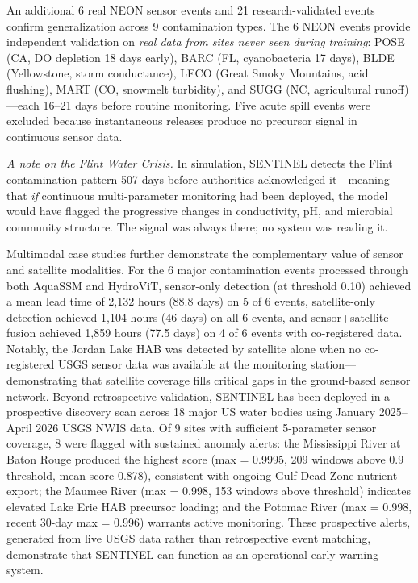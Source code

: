 \documentclass[12pt]{article}
\begin{document}
An additional 6 real NEON sensor events and 21 research-validated events confirm generalization across 9 contamination types. The 6 NEON events provide independent validation on \textit{real data from sites never seen during training}: POSE (CA, DO depletion 18 days early), BARC (FL, cyanobacteria 17 days), BLDE (Yellowstone, storm conductance), LECO (Great Smoky Mountains, acid flushing), MART (CO, snowmelt turbidity), and SUGG (NC, agricultural runoff)---each 16--21 days before routine monitoring. Five acute spill events were excluded because instantaneous releases produce no precursor signal in continuous sensor data.

\textit{A note on the Flint Water Crisis.} In simulation, SENTINEL detects the Flint contamination pattern 507 days before authorities acknowledged it---meaning that \textit{if} continuous multi-parameter monitoring had been deployed, the model would have flagged the progressive changes in conductivity, pH, and microbial community structure. The signal was always there; no system was reading it.

Multimodal case studies further demonstrate the complementary value of sensor and satellite modalities. For the 6 major contamination events processed through both AquaSSM and HydroViT, sensor-only detection (at threshold 0.10) achieved a mean lead time of 2,132 hours (88.8 days) on 5 of 6 events, satellite-only detection achieved 1,104 hours (46 days) on all 6 events, and sensor+satellite fusion achieved 1,859 hours (77.5 days) on 4 of 6 events with co-registered data. Notably, the Jordan Lake HAB was detected by satellite alone when no co-registered USGS sensor data was available at the monitoring station---demonstrating that satellite coverage fills critical gaps in the ground-based sensor network. Beyond retrospective validation, SENTINEL has been deployed in a prospective discovery scan across 18 major US water bodies using January 2025--April 2026 USGS NWIS data. Of 9 sites with sufficient 5-parameter sensor coverage, 8 were flagged with sustained anomaly alerts: the Mississippi River at Baton Rouge produced the highest score (max = 0.9995, 209 windows above 0.9 threshold, mean score 0.878), consistent with ongoing Gulf Dead Zone nutrient export; the Maumee River (max = 0.998, 153 windows above threshold) indicates elevated Lake Erie HAB precursor loading; and the Potomac River (max = 0.998, recent 30-day max = 0.996) warrants active monitoring. These prospective alerts, generated from live USGS data rather than retrospective event matching, demonstrate that SENTINEL can function as an operational early warning system.
\end{document}
